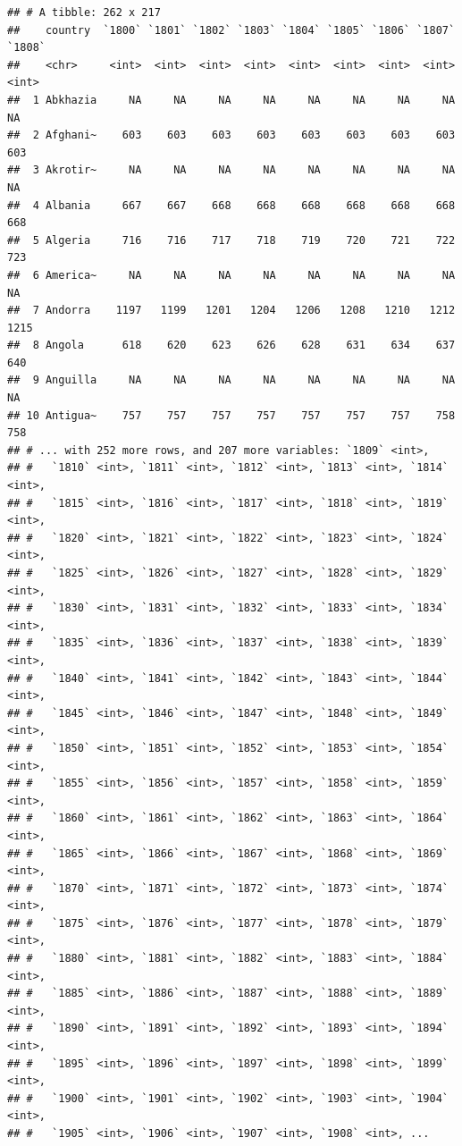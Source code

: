 \documentclass[]{book}
\theoremstyle{definition}
\theoremstyle{definition}
\theoremstyle{definition}
\theoremstyle{remark}
\begin{document}
\begin{verbatim}
## # A tibble: 262 x 217
##    country  `1800` `1801` `1802` `1803` `1804` `1805` `1806` `1807` `1808`
##    <chr>     <int>  <int>  <int>  <int>  <int>  <int>  <int>  <int>  <int>
##  1 Abkhazia     NA     NA     NA     NA     NA     NA     NA     NA     NA
##  2 Afghani~    603    603    603    603    603    603    603    603    603
##  3 Akrotir~     NA     NA     NA     NA     NA     NA     NA     NA     NA
##  4 Albania     667    667    668    668    668    668    668    668    668
##  5 Algeria     716    716    717    718    719    720    721    722    723
##  6 America~     NA     NA     NA     NA     NA     NA     NA     NA     NA
##  7 Andorra    1197   1199   1201   1204   1206   1208   1210   1212   1215
##  8 Angola      618    620    623    626    628    631    634    637    640
##  9 Anguilla     NA     NA     NA     NA     NA     NA     NA     NA     NA
## 10 Antigua~    757    757    757    757    757    757    757    758    758
## # ... with 252 more rows, and 207 more variables: `1809` <int>,
## #   `1810` <int>, `1811` <int>, `1812` <int>, `1813` <int>, `1814` <int>,
## #   `1815` <int>, `1816` <int>, `1817` <int>, `1818` <int>, `1819` <int>,
## #   `1820` <int>, `1821` <int>, `1822` <int>, `1823` <int>, `1824` <int>,
## #   `1825` <int>, `1826` <int>, `1827` <int>, `1828` <int>, `1829` <int>,
## #   `1830` <int>, `1831` <int>, `1832` <int>, `1833` <int>, `1834` <int>,
## #   `1835` <int>, `1836` <int>, `1837` <int>, `1838` <int>, `1839` <int>,
## #   `1840` <int>, `1841` <int>, `1842` <int>, `1843` <int>, `1844` <int>,
## #   `1845` <int>, `1846` <int>, `1847` <int>, `1848` <int>, `1849` <int>,
## #   `1850` <int>, `1851` <int>, `1852` <int>, `1853` <int>, `1854` <int>,
## #   `1855` <int>, `1856` <int>, `1857` <int>, `1858` <int>, `1859` <int>,
## #   `1860` <int>, `1861` <int>, `1862` <int>, `1863` <int>, `1864` <int>,
## #   `1865` <int>, `1866` <int>, `1867` <int>, `1868` <int>, `1869` <int>,
## #   `1870` <int>, `1871` <int>, `1872` <int>, `1873` <int>, `1874` <int>,
## #   `1875` <int>, `1876` <int>, `1877` <int>, `1878` <int>, `1879` <int>,
## #   `1880` <int>, `1881` <int>, `1882` <int>, `1883` <int>, `1884` <int>,
## #   `1885` <int>, `1886` <int>, `1887` <int>, `1888` <int>, `1889` <int>,
## #   `1890` <int>, `1891` <int>, `1892` <int>, `1893` <int>, `1894` <int>,
## #   `1895` <int>, `1896` <int>, `1897` <int>, `1898` <int>, `1899` <int>,
## #   `1900` <int>, `1901` <int>, `1902` <int>, `1903` <int>, `1904` <int>,
## #   `1905` <int>, `1906` <int>, `1907` <int>, `1908` <int>, ...
\end{verbatim}
\end{document}
